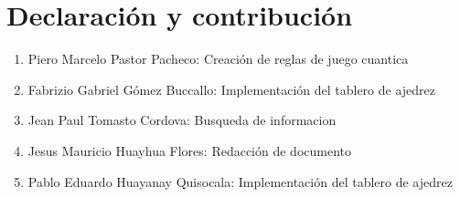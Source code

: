 \section{Declaración y contribución}
\begin{enumerate}
\item Piero Marcelo Pastor Pacheco: Creación de reglas de juego cuantica\dotfill
\item Fabrizio Gabriel Gómez  Buccallo: Implementación del tablero de ajedrez
\item Jean Paul Tomasto Cordova: Busqueda de informacion 
\item Jesus Mauricio Huayhua Flores: Redacción de documento 
\item Pablo Eduardo Huayanay Quisocala: Implementación del tablero de ajedrez 
\end{enumerate}
